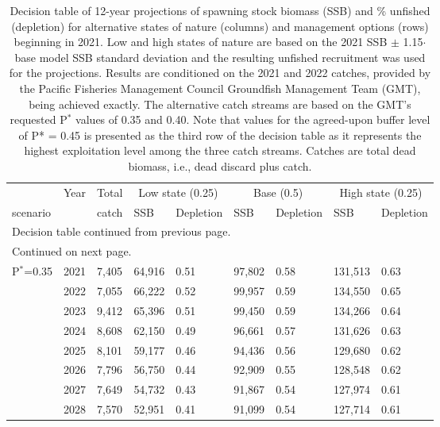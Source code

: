 \documentclass[11pt,
  english,
  a4paper,
]{article}
\begin{document}
\begingroup\fontsize{9}{11}\selectfont
\begingroup\fontsize{9}{11}\selectfont
{}
\begin{longtable}{lll|ll|ll|ll}
\caption{Decision table of 12-year projections of spawning stock biomass (SSB) and \% unfished (depletion) for alternative states of nature (columns) and management options (rows) beginning in 2021. Low and high states of nature are based on the 2021 SSB $\pm$ 1.15$\cdot$base model SSB standard deviation and the resulting unfished recruitment was used for the projections. Results are conditioned on the 2021 and 2022 catches, provided by the Pacific Fisheries Management Council Groundfish Management Team (GMT), being achieved exactly. The alternative catch streams are based on the GMT's requested P$^*$ values of 0.35 and 0.40. Note that values for the agreed-upon buffer level of P* = 0.45 is presented as the third row of the decision table as it represents the highest exploitation level among the three catch streams. Catches are total dead biomass, i.e., dead discard plus catch.} \\ 
  \hline
&Year&Total& \multicolumn{2}{c}{Low state (0.25)} & \multicolumn{2}{c}{Base (0.5)} & \multicolumn{2}{c}{High state (0.25)} \\
scenario & &catch& SSB & Depletion & SSB & Depletion & SSB & Depletion \\  
\hline \endfirsthead
\multicolumn{9}{l}{\footnotesize Decision table continued from previous page.} \\
\hline \endhead
\hline
\multicolumn{9}{l}{\footnotesize Continued on next page.} \\
\endfoot
\endlastfoot
\hline
P$^*$=0.35
& 2021 & 7,405 & 64,916 & 0.51 & 97,802& 0.58 & 131,513 & 0.63 \\ 
&  2022 & 7,055 & 66,222 & 0.52 & 99,957 & 0.59 & 134,550 & 0.65 \\ 
&  2023 & 9,412 & 65,396 & 0.51 & 99,450 & 0.59 & 134,266 & 0.64 \\ 
&  2024 & 8,608 & 62,150 & 0.49 & 96,661 & 0.57 & 131,626 & 0.63 \\ 
&  2025 & 8,101 & 59,177 & 0.46 & 94,436 & 0.56 & 129,680 & 0.62 \\ 
&  2026 & 7,796 & 56,750 & 0.44 & 92,909 & 0.55 & 128,548 & 0.62 \\ 
&  2027 & 7,649 & 54,732 & 0.43 & 91,867 & 0.54 & 127,974 & 0.61 \\ 
&  2028 & 7,570 & 52,951 & 0.41 & 91,099 & 0.54 & 127,714 & 0.61 \\ 

\end{longtable}
\end{document}
